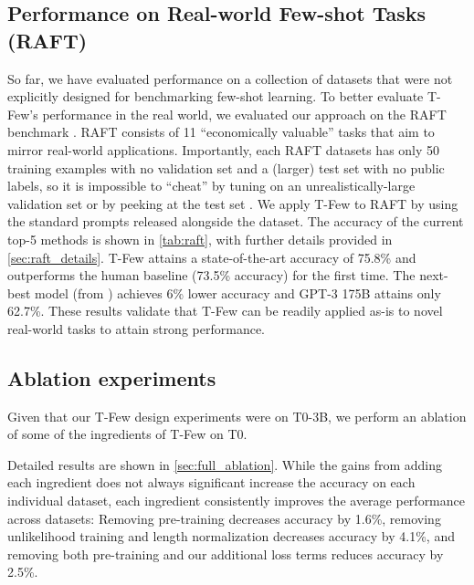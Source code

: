 \subsection{Performance on Real-world Few-shot Tasks (RAFT)}
\label{sec:raft}

So far, we have evaluated performance on a collection of datasets that were not explicitly designed for benchmarking few-shot learning. To better evaluate {\selectfont T-Few}'s performance in the real world, we evaluated our approach on the RAFT benchmark \cite{alex2021raft}. RAFT consists of 11 ``economically valuable'' tasks that aim to mirror real-world applications. Importantly, each RAFT datasets has only 50 training examples with no validation set and a (larger) test set with no public labels, so it is impossible to ``cheat'' by tuning on an unrealistically-large validation set or by peeking at the test set \citep{oliver2018realistic,perez2021true}. We apply {\selectfont T-Few} to RAFT by using the standard prompts released alongside the dataset. The accuracy of the current top-5 methods is shown in \ref{tab:raft}, with further details provided in \ref{sec:raft_details}.
{\selectfont T-Few} attains a state-of-the-art accuracy of 75.8\% and outperforms the human baseline (73.5\% accuracy) for the first time. The next-best model (from \citet{schick2021true}) achieves 6\% lower accuracy and GPT-3 175B attains only 62.7\%.
These results validate that {\selectfont T-Few} can be readily applied as-is to novel real-world tasks to attain strong performance.

\subsection{Ablation experiments}
\label{sec:ablation}

Given that our {\selectfont T-Few} design experiments were on T0-3B, we perform an ablation of some of the ingredients of {\selectfont T-Few} on T0.

Detailed results are shown in \ref{sec:full_ablation}.
While the gains from adding each ingredient does not always significant increase the accuracy on each individual dataset, each ingredient consistently improves the average performance across datasets: Removing pre-training decreases accuracy by 1.6\%, removing unlikelihood training and length normalization decreases accuracy by 4.1\%, and removing both pre-training and our additional loss terms reduces accuracy by 2.5\%.

